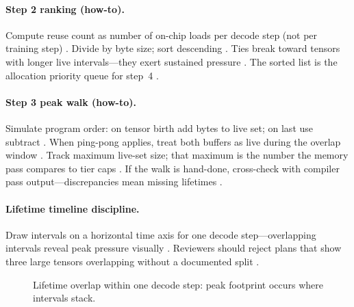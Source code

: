 \paragraph{Step 2 ranking (how-to).}
Compute reuse count as number of on-chip loads per decode step (not per training step) \citep{patel2025llminference,dao2022flashattention}.
Divide by byte size; sort descending \citep{dlbook}.
Ties break toward tensors with longer live intervals---they exert sustained pressure \citep{wu2024mirage,yirage2026}.
The sorted list is the allocation priority queue for step~4 \citep{rotem2018glow,chen2020compilerbasedhardw}.

\paragraph{Step 3 peak walk (how-to).}
Simulate program order: on tensor birth add bytes to live set; on last use subtract \citep{yirage2026,rotem2018glow}.
When ping-pong applies, treat both buffers as live during the overlap window \citep{semianalysis2024tma,dao2022flashattention}.
Track maximum live-set size; that maximum is the number the memory pass compares to tier caps \citep{nvidia2022hopper,amd2024aie,chen2020compilerbasedhardw}.
If the walk is hand-done, cross-check with compiler pass output---discrepancies mean missing lifetimes \citep{yirage2026,wu2024mirage}.

\paragraph{Lifetime timeline discipline.}
Draw intervals on a horizontal time axis for one decode step---overlapping intervals reveal peak pressure visually \citep{wu2024mirage,dlbook}.
Reviewers should reject plans that show three large tensors overlapping without a documented split \citep{yirage2026,taxbreak2026}.

\begin{figure}[t]
\centering
{}
\caption{Lifetime overlap within one decode step: peak footprint occurs where intervals stack.}
\label{fig:ch06_lifetime_timeline}
\end{figure}

